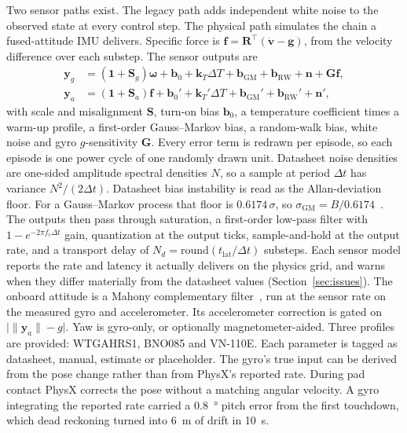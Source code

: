 \documentclass[journal]{IEEEtran}
\newcommand{\refsec}[1]{Section~\ref{#1}}
\newcommand{\vect}[1]{\bm{#1}}
\newcommand{\mat}[1]{\mathbf{#1}}
\newcommand{\wb}{\vect{\omega}}
\begin{document}
Two sensor paths exist.
The legacy path adds independent white noise to the observed state at every control step.
The physical path simulates the chain a fused-attitude IMU delivers.
Specific force is $\vect{f} = \mat{R}^\top(\dot{\vect{v}} - \vect{g})$, from the velocity difference over each substep.
The sensor outputs are
\begin{align}
\vect{y}_g &= (\mat{1} + \mat{S}_g)\wb + \vect{b}_0 + \vect{k}_T\Delta T + \vect{b}_{\text{GM}} + \vect{b}_{\text{RW}} + \vect{n} + \mat{G}\vect{f}, \label{eq:gyro}\\
\vect{y}_a &= (\mat{1} + \mat{S}_a)\vect{f} + \vect{b}_0' + \vect{k}_T'\Delta T + \vect{b}_{\text{GM}}' + \vect{b}_{\text{RW}}' + \vect{n}', \nonumber
\end{align}
with scale and misalignment $\mat{S}$, turn-on bias $\vect{b}_0$, a temperature coefficient times a warm-up profile, a first-order Gauss--Markov bias, a random-walk bias, white noise and gyro $g$-sensitivity $\mat{G}$.
Every error term is redrawn per episode, so each episode is one power cycle of one randomly drawn unit.
Datasheet noise densities are one-sided amplitude spectral densities $N$, so a sample at period $\Delta t$ has variance $N^2/(2\Delta t)$.
Datasheet bias instability is read as the Allan-deviation floor.
For a Gauss--Markov process that floor is $0.6174\,\sigma$, so $\sigma_{\text{GM}} = B/0.6174$~\cite{elsheimy2008allan}.
The outputs then pass through saturation, a first-order low-pass filter with $1 - e^{-2\pi f_c\Delta t}$ gain, quantization at the output ticks, sample-and-hold at the output rate, and a transport delay of $N_d = \mathrm{round}(t_{\text{lat}}/\Delta t)$ substeps.
Each sensor model reports the rate and latency it actually delivers on the physics grid, and warns when they differ materially from the datasheet values (\refsec{sec:issues}).
The onboard attitude is a Mahony complementary filter~\cite{mahony2008}, run at the sensor rate on the measured gyro and accelerometer.
Its accelerometer correction is gated on $\big|\|\vect{y}_a\| - g\big|$.
Yaw is gyro-only, or optionally magnetometer-aided.
Three profiles are provided: WTGAHRS1, BNO085 and VN-110E.
Each parameter is tagged as datasheet, manual, estimate or placeholder.
The gyro's true input can be derived from the pose change rather than from PhysX's reported rate.
During pad contact PhysX corrects the pose without a matching angular velocity.
A gyro integrating the reported rate carried a \SI{0.8}{\degree} pitch error from the first touchdown, which dead reckoning turned into \SI{6}{\metre} of drift in \SI{10}{\second}.
\end{document}
